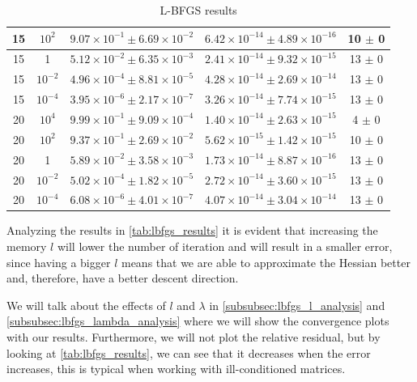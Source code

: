 \begin{table}[H]
\begin{tabular}{c|c|c|c|c}
15 & $10^2$ & $9.07 \times 10^{-1} \pm 6.69 \times 10^{-2}$ & $6.42 \times 10^{-14} \pm 4.89 \times 10^{-16}$ & 10 $\pm$ 0 \\ \hline

\rowcolor{gray!30} 15 & 1 & $5.12 \times 10^{-2} \pm 6.35 \times 10^{-3}$ & $2.41 \times 10^{-14} \pm 9.32 \times 10^{-15}$ & 13 $\pm$ 0 \\ \hline

15 & $10^{-2}$ & $4.96 \times 10^{-4} \pm 8.81 \times 10^{-5}$ & $4.28 \times 10^{-14} \pm 2.69 \times 10^{-14}$ & 13 $\pm$ 0 \\ \hline

\rowcolor{gray!30} 15 & $10^{-4}$ & $3.95 \times 10^{-6} \pm 2.17 \times 10^{-7}$ & $3.26 \times 10^{-14} \pm 7.74 \times 10^{-15}$ & 13 $\pm$ 0 \\ \hline

20 & $10^4$ & $9.99 \times 10^{-1} \pm 9.09 \times 10^{-4}$ & $1.40 \times 10^{-14} \pm 2.63 \times 10^{-15}$ & 4 $\pm$ 0 \\ \hline

\rowcolor{gray!30} 20 & $10^2$ & $9.37 \times 10^{-1} \pm 2.69 \times 10^{-2}$ & $5.62 \times 10^{-15} \pm 1.42 \times 10^{-15}$ & 10 $\pm$ 0 \\ \hline

20 & 1 & $5.89 \times 10^{-2} \pm 3.58 \times 10^{-3}$ & $1.73 \times 10^{-14} \pm 8.87 \times 10^{-16}$ & 13 $\pm$ 0 \\ \hline

\rowcolor{gray!30} 20 & $10^{-2}$ & $5.02 \times 10^{-4} \pm 1.82 \times 10^{-5}$ & $2.72 \times 10^{-14} \pm 3.60 \times 10^{-15}$ & 13 $\pm$ 0 \\ \hline

20 & $10^{-4}$ & $6.08 \times 10^{-6} \pm 4.01 \times 10^{-7}$ & $4.07 \times 10^{-14} \pm 3.04 \times 10^{-14}$ & 13 $\pm$ 0 \\ \hline \hline
\end{tabular}
\caption{L-BFGS results}
\label{tab:lbfgs_results}
\end{table}

\noindent Analyzing the results in \autoref{tab:lbfgs_results} it is evident that increasing the memory $l$ will lower the number of iteration and will result in a smaller error, since having a bigger $l$ means that we are able to approximate the Hessian better and, therefore, have a better descent direction.
\vspace{3mm}

\noindent We will talk about the effects of $l$ and $\lambda$ in \ref{subsubsec:lbfgs_l_analysis} and \ref{subsubsec:lbfgs_lambda_analysis} where we will show the convergence plots with our results. Furthermore, we will not plot the relative residual, but by looking at \autoref{tab:lbfgs_results}, we can see that it decreases when the error increases, this is typical when working with ill-conditioned matrices.
\vspace{3mm}

